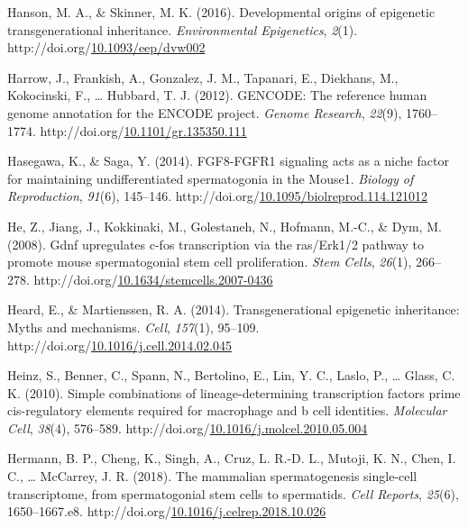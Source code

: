 \documentclass[12pt,twoside]{reedthesis}
\newlength{\cslhangindent}
\newenvironment{CSLReferences}[2] %
 {%
  \setlength{\parindent}{0pt}
  \ifodd #1 \everypar{\setlength{\hangindent}{\cslhangindent}}\ignorespaces\fi
  \ifnum #2 > 0
  \setlength{\parskip}{#2\baselineskip}
  \fi
 }%
 {}
\begin{document}
\begin{CSLReferences}{1}{0}
\leavevmode{}%
Hanson, M. A., \& Skinner, M. K. (2016). Developmental origins of epigenetic transgenerational inheritance. \emph{Environmental Epigenetics}, \emph{2}(1). http://doi.org/\href{https://doi.org/10.1093/eep/dvw002}{10.1093/eep/dvw002}

\leavevmode{}%
Harrow, J., Frankish, A., Gonzalez, J. M., Tapanari, E., Diekhans, M., Kokocinski, F., \ldots{} Hubbard, T. J. (2012). GENCODE: The reference human genome annotation for the ENCODE project. \emph{Genome Research}, \emph{22}(9), 1760--1774. http://doi.org/\href{https://doi.org/10.1101/gr.135350.111}{10.1101/gr.135350.111}

\leavevmode{}%
Hasegawa, K., \& Saga, Y. (2014). FGF8-FGFR1 signaling acts as a niche factor for maintaining undifferentiated spermatogonia in the Mouse1. \emph{Biology of Reproduction}, \emph{91}(6), 145--146. http://doi.org/\href{https://doi.org/10.1095/biolreprod.114.121012}{10.1095/biolreprod.114.121012}

\leavevmode{}%
He, Z., Jiang, J., Kokkinaki, M., Golestaneh, N., Hofmann, M.-C., \& Dym, M. (2008). Gdnf upregulates c-fos transcription via the ras/Erk1/2 pathway to promote mouse spermatogonial stem cell proliferation. \emph{Stem Cells}, \emph{26}(1), 266--278. http://doi.org/\href{https://doi.org/10.1634/stemcells.2007-0436}{10.1634/stemcells.2007-0436}

\leavevmode{}%
Heard, E., \& Martienssen, R. A. (2014). Transgenerational epigenetic inheritance: Myths and mechanisms. \emph{Cell}, \emph{157}(1), 95--109. http://doi.org/\href{https://doi.org/10.1016/j.cell.2014.02.045}{10.1016/j.cell.2014.02.045}

\leavevmode{}%
Heinz, S., Benner, C., Spann, N., Bertolino, E., Lin, Y. C., Laslo, P., \ldots{} Glass, C. K. (2010). Simple combinations of lineage-determining transcription factors prime cis-regulatory elements required for macrophage and b cell identities. \emph{Molecular Cell}, \emph{38}(4), 576--589. http://doi.org/\href{https://doi.org/10.1016/j.molcel.2010.05.004}{10.1016/j.molcel.2010.05.004}

\leavevmode{}%
Hermann, B. P., Cheng, K., Singh, A., Cruz, L. R.-D. L., Mutoji, K. N., Chen, I. C., \ldots{} McCarrey, J. R. (2018). The mammalian spermatogenesis single-cell transcriptome, from spermatogonial stem cells to spermatids. \emph{Cell Reports}, \emph{25}(6), 1650--1667.e8. http://doi.org/\href{https://doi.org/10.1016/j.celrep.2018.10.026}{10.1016/j.celrep.2018.10.026}


\end{CSLReferences}
\end{document}
